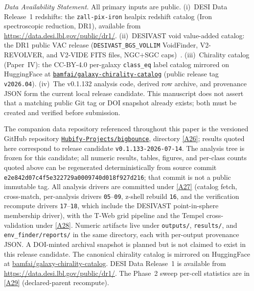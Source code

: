 \documentclass[aps,prd,twocolumn,superscriptaddress,showpacs,preprintnumbers,nofootinbib,longbibliography,floatfix]{revtex4-2}
\newcommand{\repoBase}{https://github.com/Hubify-Projects/bigbounce/blob/main}
\newcommand{\paperVersion}{v0.1.133-2026-07-14}
\begin{document}
\emph{Data Availability Statement.} All primary inputs are public.
(i)~DESI Data Release~1 redshifts: the \texttt{zall-pix-iron} healpix
redshift catalog (Iron spectroscopic reduction, DR1), available from
\url{https://data.desi.lbl.gov/public/dr1/}.
(ii)~DESIVAST void value-added catalog: the DR1 public VAC release
(\texttt{DESIVAST\_BGS\_VOLLIM} VoidFinder, V2-REVOLVER, and V2-VIDE
FITS files, NGC$+$SGC caps)~\cite{DESIVAST2025}.
(iii)~Chirality catalog (Paper~IV): the CC-BY-4.0 per-galaxy
\texttt{class\_eq} label catalog mirrored on HuggingFace at
\href{https://huggingface.co/datasets/bamfai/galaxy-chirality-catalog}%
{\texttt{bamfai/galaxy-chirality-catalog}} (public release tag
\texttt{v2026.04}).
(iv)~The v0.1.132 analysis code, derived row archive, and provenance JSON
form the current local release candidate. This manuscript does not assert that a
matching public Git tag or DOI snapshot already exists; both must be
created and verified before submission.

The companion data repository referenced throughout this paper is the
versioned GitHub repository
\href{https://github.com/Hubify-Projects/bigbounce}%
{\texttt{Hubify-Projects/bigbounce}}, directory
\href{\repoBase/pipelines/p5\_desi\_chirality/}{[A26]}; results quoted here
correspond to release candidate \texttt{\paperVersion}. The analysis
tree is frozen for this candidate; all numeric results, tables,
figures, and per-class counts quoted above can be regenerated
deterministically from source commit
\texttt{e2e842d07c4f5e322729a0009740d018f927d216}; that commit is not a
public immutable tag. All analysis
drivers are committed under
\href{\repoBase/pipelines/p5\_desi\_chirality/scripts/}{[A27]} (catalog fetch,
cross-match, per-analysis drivers \texttt{05}--\texttt{09}, z-shell
rebuild \texttt{16}, and the verification recompute drivers
\texttt{17}--\texttt{18}, which include the DESIVAST point-in-sphere
membership driver), with the T-Web grid pipeline and the Tempel
cross-validation under
\href{\repoBase/pipelines/p5\_desi\_chirality/env\_finder/}{[A28]}. Numeric
artifacts live under \texttt{outputs/}, \texttt{results/}, and
\texttt{env\_finder/reports/} in the same directory, each with
per-output provenance JSON. A DOI-minted archival snapshot is planned
but is not claimed to exist in this release candidate. The canonical chirality
catalog is mirrored on HuggingFace at
\href{https://huggingface.co/datasets/bamfai/galaxy-chirality-catalog}%
{bamfai/galaxy-chirality-catalog}. DESI Data Release~1 is available from
\url{https://data.desi.lbl.gov/public/dr1/}. The Phase~2 sweep
per-cell statistics are in
\href{\repoBase/pipelines/p5\_desi\_chirality/env\_finder/reports/02\_phase2\_sweep.csv}{[A29]}
(declared-parent recompute).
\end{document}

